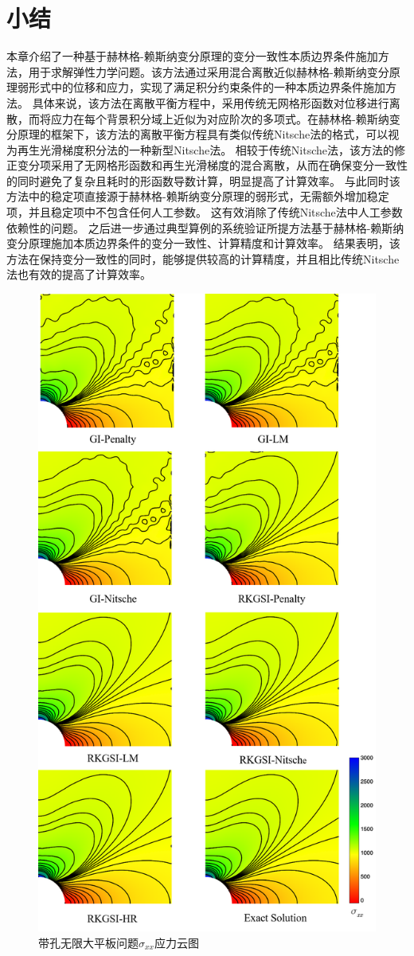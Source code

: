 \section{小结}
本章介绍了一种基于赫林格-赖斯纳变分原理的变分一致性本质边界条件施加方法，用于求解弹性力学问题。该方法通过采用混合离散近似赫林格-赖斯纳变分原理弱形式中的位移和应力，实现了满足积分约束条件的一种本质边界条件施加方法。
具体来说，该方法在离散平衡方程中，采用传统无网格形函数对位移进行离散，而将应力在每个背景积分域上近似为对应阶次的多项式。在赫林格-赖斯纳变分原理的框架下，该方法的离散平衡方程具有类似传统Nitsche法的格式，可以视为再生光滑梯度积分法的一种新型Nitsche法。
相较于传统Nitsche法，该方法的修正变分项采用了无网格形函数和再生光滑梯度的混合离散，从而在确保变分一致性的同时避免了复杂且耗时的形函数导数计算，明显提高了计算效率。
与此同时该方法中的稳定项直接源于赫林格-赖斯纳变分原理的弱形式，无需额外增加稳定项，并且稳定项中不包含任何人工参数。
这有效消除了传统Nitsche法中人工参数依赖性的问题。
之后进一步通过典型算例的系统验证所提方法基于赫林格-赖斯纳变分原理施加本质边界条件的变分一致性、计算精度和计算效率。
结果表明，该方法在保持变分一致性的同时，能够提供较高的计算精度，并且相比传统Nitsche法也有效的提高了计算效率。
\begin{figure}[H]
    \centering
    \includegraphics[scale=0.55]{figure/EHR/hole/sigmaxx.png}
\caption{带孔无限大平板问题$\sigma_{xx}$应力云图}\label{sigmaxx}
\end{figure}
